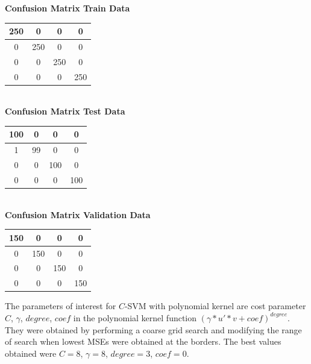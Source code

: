 \documentclass{article}
\begin{document}
\begin{flushleft}
\newpage
\textbf{Confusion Matrix Train Data\\[5pt]}
\begin{tabular}{|c|c|c|c|}
\hline
250 & 0 & 0 & 0 \\
\hline
0 & 250 & 0 & 0 \\
\hline
0 & 0 & 250 & 0 \\
\hline
0 & 0 & 0 & 250 \\
\hline
\end{tabular}
\textbf{\\[10pt] Confusion Matrix Test Data \\[5pt]}
\begin{tabular}{|c|c|c|c|}
\hline
100 & 0 & 0 & 0 \\
\hline
1 & 99 & 0 & 0 \\
\hline
0 & 0 & 100 & 0 \\
\hline
0 & 0 & 0 & 100 \\
\hline
\end{tabular}
\textbf{\\[10pt] Confusion Matrix Validation Data \\[5pt]}
\begin{tabular}{|c|c|c|c|}
\hline
150 & 0 & 0 & 0 \\
\hline
0 & 150 & 0 & 0 \\
\hline
0 & 0 & 150 & 0 \\
\hline
0 & 0 & 0 & 150 \\
\hline
\end{tabular}
\end{flushleft}

The parameters of interest for $C$-SVM with polynomial kernel are cost parameter $C$, $\gamma$, $degree$, $coef$ in the polynomial kernel function $(\gamma*u'*v+coef)^{degree}$. They were obtained by performing a coarse grid search and modifying the range of search when lowest MSEs were obtained at the borders.
The best values obtained were $C=8$, $\gamma=8$, $degree=3$, $coef=0$.
\end{document}
